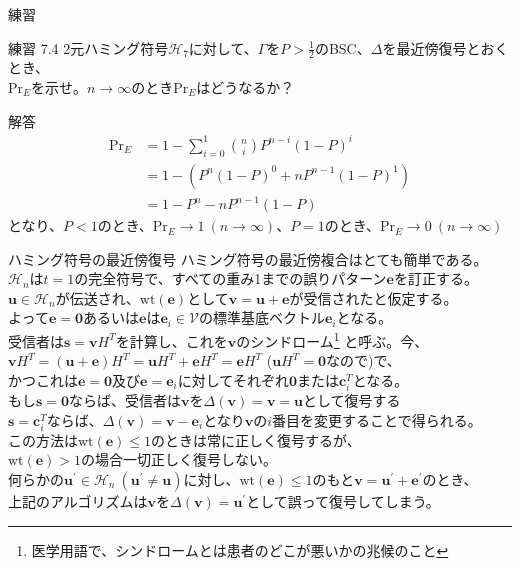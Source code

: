 \documentclass[dvipdfmx,10pt,jsarticle]{beamer}
\newcommand{\code}[1]{\mathcal{#1}}
\newcommand{\vs}[1]{\mathcal{#1}}
\renewcommand{\vec}[1]{\mathbf{#1}}
\begin{document}
  \begin{frame}{練習}
    \begin{block}{練習 7.4}
      2元ハミング符号$\code{H}_7$に対して、$\Gamma$を$P > \frac 12$のBSC、$\Delta$を最近傍復号とおくとき、 \\
      $\text{Pr}_E$を示せ。$n \rightarrow \infty$のとき$\text{Pr}_E$はどうなるか？
    \end{block}
    \begin{block}{解答}
      \begin{align*}
        \text{Pr}_E &= 1 - \sum_{i=0}^{1} \binom ni P^{n-i} {(1-P)}^i  \\
        &= 1 - (P^{n} {(1-P)}^0 + n P^{n-1} {(1-P)}^1) \\
        &= 1 - P^n - nP^{n-1}(1 - P)
      \end{align*}
      となり、$P < 1$のとき、$\text{Pr}_E \rightarrow 1 \ (n \rightarrow \infty)$、$P = 1$のとき、$\text{Pr}_E \rightarrow 0 \ (n \rightarrow \infty) $
    \end{block}
  \end{frame}
  \begin{frame}{ハミング符号の最近傍復号}
    ハミング符号の最近傍複合はとても簡単である。 \\
    \vspace{1em}
    $\code{H}_n$は$t=1$の完全符号で、すべての重み1までの誤りパターン$\vec{e}$を訂正する。\\
    $\vec{u} \in \code{H}_n$が伝送され、$\text{wt}(\vec{e})$として$\vec{v} = \vec{u} + \vec{e}$が受信されたと仮定する。 \\
    よって$\vec{e} =\vec{0}$あるいは$\vec{e}$は$\vec{e}_i \in \vs{V}$の標準基底ベクトル$\vec{e}_i$となる。 \\
    \vspace{1em}
    受信者は$\vec{s} = \vec{v} H^T$を計算し、これを$\vec{v}$のシンドローム\footnote{{\scriptsize 医学用語で、シンドロームとは患者のどこが悪いかの兆候のこと}}
    と呼ぶ。今、$\vec{v}H^T = (\vec{u} + \vec{e}) H^T = \vec{u}H^T + \vec{e}H^T = \vec{e}H^T$ ($\vec{u}H^T = \vec{0}$なので)で、\\
    かつこれは$\vec{e} = \vec{0}$及び$\vec{e} = \vec{e}_i$に対してそれぞれ$\vec{0}$または$\vec{c}^T_i$となる。\\
    \vspace{1em}
    もし$\vec{s} = \vec{0}$ならば、受信者は$\vec{v}$を$\Delta (\vec{v}) = \vec{v} = \vec{u}$として復号する \\
    $\vec{s}= \vec{c}^T_i$ならば、$\Delta(\vec{v}) = \vec{v} - \vec{e}_i$となり$\vec{v}$の$i$番目を変更することで得られる。 \\
    この方法は$\text{wt}(\vec{e}) \leq 1$のときは常に正しく復号するが、\\
    $\text{wt}(\vec{e}) >1$の場合一切正しく復号しない。\\
    何らかの$\vec{u}^\prime \in \code{H}_n \ (\vec{u}^\prime \neq \vec{u})$に対し、$\text{wt}(\vec{e}) \leq 1$のもと$\vec{v} = \vec{u}^\prime + \vec{e}^\prime$のとき、 \\
    上記のアルゴリズムは$\vec{v}$を$\Delta (\vec{v}) = \vec{u}^\prime$として誤って復号してしまう。

  \end{frame}
\end{document}
